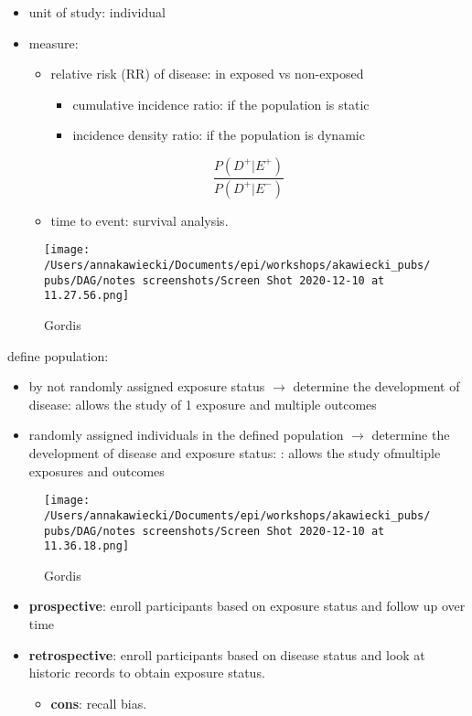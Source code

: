 \documentclass[
]{article}
\providecommand{\tightlist}{%
  \setlength{\itemsep}{0pt}\setlength{\parskip}{0pt}}
\begin{document}
\begin{itemize}
\item
  unit of study: individual
\item
  measure:

  \begin{itemize}
  \item
    relative risk (RR) of disease: in exposed vs non-exposed

    \begin{itemize}
    \item
      cumulative incidence ratio: if the population is static
    \item
      incidence density ratio: if the population is dynamic
    \end{itemize}
  \end{itemize}

  \[\frac{P(D^+|E^+)}{P(D^+|E^-)}\]

  \begin{itemize}
  \tightlist
  \item
    time to event: survival analysis.
  \end{itemize}
\end{itemize}

\begin{figure}
\centering
\texttt{[image: /Users/annakawiecki/Documents/epi/workshops/akawiecki\_pubs/pubs/DAG/notes screenshots/Screen Shot 2020-12-10 at 11.27.56.png]}
\caption{Gordis}
\end{figure}

define population:

\begin{itemize}
\item
  by not randomly assigned exposure status \(\to\) determine the
  development of disease: allows the study of 1 exposure and multiple
  outcomes
\item
  randomly assigned individuals in the defined population \(\to\)
  determine the development of disease and exposure status: : allows the
  study ofmultiple exposures and outcomes
\end{itemize}

\begin{figure}
\centering
\texttt{[image: /Users/annakawiecki/Documents/epi/workshops/akawiecki\_pubs/pubs/DAG/notes screenshots/Screen Shot 2020-12-10 at 11.36.18.png]}
\caption{Gordis}
\end{figure}

\begin{itemize}
\item
  \textbf{prospective}: enroll participants based on exposure status and
  follow up over time
\item
  \textbf{retrospective}: enroll participants based on disease status
  and look at historic records to obtain exposure status.

  \begin{itemize}
  \tightlist
  \item
    \textbf{cons}: recall bias.
  \end{itemize}
\end{itemize}
\end{document}
